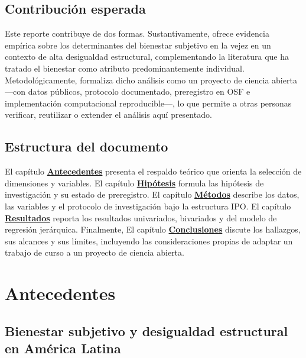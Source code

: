 \documentclass[
  spanish,
  a4paper,
  oneside]{scrbook}
\begin{document}
\section{Contribución esperada}\label{contribuciuxf3n-esperada}

Este reporte contribuye de dos formas. Sustantivamente, ofrece evidencia
empírica sobre los determinantes del bienestar subjetivo en la vejez en
un contexto de alta desigualdad estructural, complementando la
literatura que ha tratado el bienestar como atributo predominantemente
individual. Metodológicamente, formaliza dicho análisis como un proyecto
de ciencia abierta ---con datos públicos, protocolo documentado,
preregistro en OSF e implementación computacional reproducible---, lo
que permite a otras personas verificar, reutilizar o extender el
análisis aquí presentado.

\section{Estructura del documento}\label{estructura-del-documento}

El capítulo \href{02-antecedentes.html}{\textbf{Antecedentes}} presenta
el respaldo teórico que orienta la selección de dimensiones y variables.
El capítulo \hyperref[sec-hipotesis]{\textbf{Hipótesis}} formula las
hipótesis de investigación y su estado de preregistro. El capítulo
\hyperref[sec-metodos]{\textbf{Métodos}} describe los datos, las
variables y el protocolo de investigación bajo la estructura IPO. El
capítulo \hyperref[sec-resultados]{\textbf{Resultados}} reporta los
resultados univariados, bivariados y del modelo de regresión jerárquica.
Finalmente, El capítulo
\hyperref[sec-conclusiones]{\textbf{Conclusiones}} discute los
hallazgos, sus alcances y sus límites, incluyendo las consideraciones
propias de adaptar un trabajo de curso a un proyecto de ciencia abierta.


\chapter{Antecedentes}\label{antecedentes}

\section{Bienestar subjetivo y desigualdad estructural en América
Latina}\label{bienestar-subjetivo-y-desigualdad-estructural-en-amuxe9rica-latina}
\end{document}
